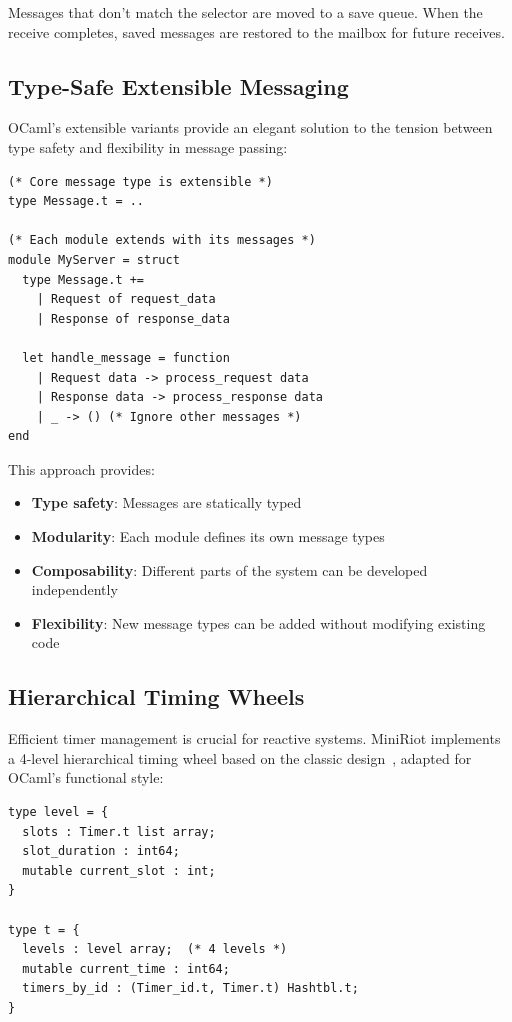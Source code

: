 \documentclass[sigplan,screen]{acmart}
\begin{document}
Messages that don't match the selector are moved to a save queue. When the receive completes, saved messages are restored to the mailbox for future receives.

\subsection{Type-Safe Extensible Messaging}

OCaml's extensible variants provide an elegant solution to the tension between type safety and flexibility in message passing:

\begin{lstlisting}
(* Core message type is extensible *)
type Message.t = ..

(* Each module extends with its messages *)
module MyServer = struct
  type Message.t += 
    | Request of request_data
    | Response of response_data
    
  let handle_message = function
    | Request data -> process_request data
    | Response data -> process_response data
    | _ -> () (* Ignore other messages *)
end
\end{lstlisting}

This approach provides:
\begin{itemize}
\item \textbf{Type safety}: Messages are statically typed
\item \textbf{Modularity}: Each module defines its own message types
\item \textbf{Composability}: Different parts of the system can be developed independently
\item \textbf{Flexibility}: New message types can be added without modifying existing code
\end{itemize}

\subsection{Hierarchical Timing Wheels}

Efficient timer management is crucial for reactive systems. MiniRiot implements a 4-level hierarchical timing wheel based on the classic design~\cite{varghese1987}, adapted for OCaml's functional style:

\begin{lstlisting}
type level = {
  slots : Timer.t list array;
  slot_duration : int64;
  mutable current_slot : int;
}

type t = {
  levels : level array;  (* 4 levels *)
  mutable current_time : int64;
  timers_by_id : (Timer_id.t, Timer.t) Hashtbl.t;
}
\end{lstlisting}
\end{document}
